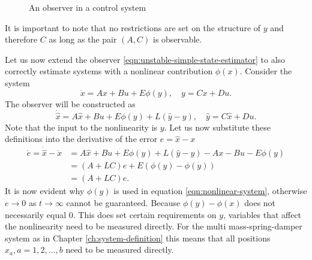 \begin{figure}[h]
    \centering
    \caption{An observer in a control system}
    \label{fig:observer-diagram}
\end{figure}

It is important to note that no restrictions are set on the structure of $y$ and therefore $C$ as long as the pair $(A,C)$ is observable. 

Let us now extend the observer \eqref{eqn:unstable-simple-state-estimator} to also correctly estimate systems with a nonlinear contribution $\phi(x)$. Consider the system
\begin{equation*}\label{eqn:nonlinear-system}
    \dot{x} = Ax + Bu + E\phi(y), \quad y = Cx + Du.
\end{equation*}
The observer will be constructed as
\begin{equation}
    \dot{\hat{x}} = A\hat{x} + Bu + E\phi(y) + L(\hat{y} - y), \quad \hat{y} = C\hat{x} + Du.
\end{equation}
Note that the input to the nonlinearity is $y$. Let us now substitute these definitions into the derivative of the error $e=\hat{x}-x$
\begin{equation*}\label{eqn:errror-nonlinear-observer}
    \begin{split}
        \dot{e} = \dot{\hat{x}} - \dot{x} &= A\hat{x} + Bu + E\phi(y) + L(\hat{y} - y) - Ax - Bu - E\phi(y) \\
        &= (A+LC)e + E(\phi(y) - \phi(y)) \\
        &= (A+LC)e.
    \end{split}
\end{equation*}
It is now evident why $\phi(y)$ is used in equation \eqref{eqn:nonlinear-system}, otherwise $e \rightarrow 0$ as $t \rightarrow \infty$ cannot be guaranteed. Because $\phi(y) - \phi(x)$ does not necessarily equal $0$. This does set certain requirements on $y$, variables that affect the nonlinearity need to be measured directly. For the multi mass-spring-damper system as in Chapter \ref{ch:system-definition} this means that all positions $x_a,a=1,2,\dots,b$ need to be measured directly. \\

